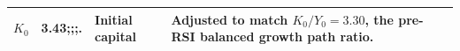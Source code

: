 \begin{table}[H]
\begin{tabular}{P{0.08\textwidth}P{0.12\textwidth}P{0.30\textwidth}P{0.36\textwidth}}
$K_0$ & 3.43;;;. & Initial capital & Adjusted to match $K_0/Y_0 =3.30$, the pre-RSI balanced growth path ratio.\\
\bottomrule
\end{tabular}
\par\vspace{4pt}
\end{table}
